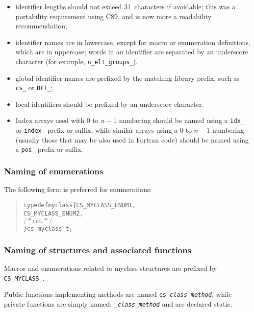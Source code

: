 \begin{itemize}

\item identifier lengths should not exceed 31~characters if avoidable;
  this was a portability requirement using C89, and is now more a
  readability recommendation;

\item identifier names are in lowercase, except for macro or enumeration
  definitions, which are in uppercase; words in an identifier are
  separated by an underscore character (for example,
  \verb=n_elt_groups_=).

\item global identifier names are prefixed by the matching library prefix,
  such as \verb=cs_= or \verb=BFT_=;

\item local identifiers should be prefixed by an underscore character.

\item Index arrays used with $0$ to $n-1$ numbering should be named
  using a \verb=idx_= or \verb=index_= prefix or suffix, while
  similar arrays using a $0$ to $n-1$ numbering (usually those that may be
  also used in Fortran code) should be named using a \verb=pos_= 
  prefix or suffix.

\end{itemize}

\subsubsection{Naming of enumerations}

The following form is preferred for enumerations:

\begin{quote}
\begin{alltt}
typedef myclass \{ CS_MYCLASS_ENUM1,
                   CS_MYCLASS_ENUM2,
                \( /* etc. */ \)
                \} cs_myclass_t;
\end{alltt}
\end{quote}

\subsubsection{Naming of structures and associated functions}

Macros and enumerations related to myclass structures
are prefixed by \verb=CS_MYCLASS_=.

Public functions implementing methods are named
 \texttt{cs\_\textit{class\_method}}, while private functions are simply named:
\texttt{\_\textit{class\_method}} and are declared static.

